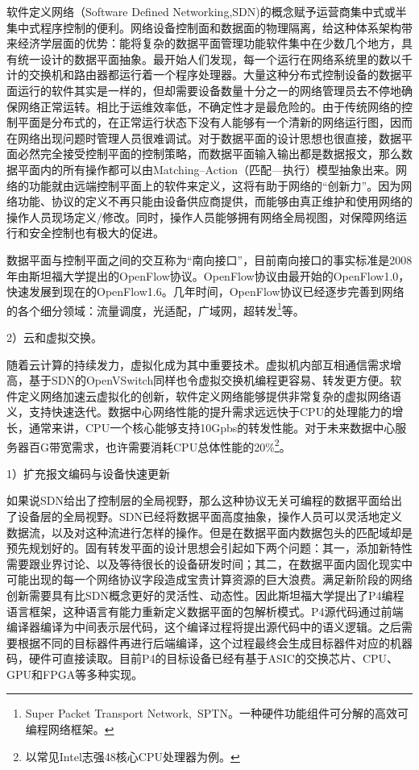 软件定义网络（Software Defined Networking,SDN)的概念赋予运营商集中式或半集中式程序控制的便利。网络设备控制面和数据面的物理隔离，给这种体系架构带来经济学层面的优势：能将复杂的数据平面管理功能软件集中在少数几个地方，具有统一设计的数据平面抽象。最开始人们发现，每一个运行在网络系统里的数以千计的交换机和路由器都运行着一个程序处理器。大量这种分布式控制设备的数据平面运行的软件其实是一样的，但却需要设备数量十分之一的网络管理员去不停地确保网络正常运转。相比于运维效率低，不确定性才是最危险的。由于传统网络的控制平面是分布式的，在正常运行状态下没有人能够有一个清新的网络运行图，因而在网络出现问题时管理人员很难调试。对于数据平面的设计思想也很直接，数据平面必然完全接受控制平面的控制策略，而数据平面输入输出都是数据报文，那么数据平面内的所有操作都可以由Matching--Action（匹配---执行）模型抽象出来。网络的功能就由远端控制平面上的软件来定义，这将有助于网络的“创新力”。因为网络功能、协议的定义不再只能由设备供应商提供，而能够由真正维护和使用网络的操作人员现场定义/修改。同时，操作人员能够拥有网络全局视图，对保障网络运行和安全控制也有极大的促进。

数据平面与控制平面之间的交互称为“南向接口”，目前南向接口的事实标准是2008年由斯坦福大学提出的OpenFlow协议。OpenFlow协议由最开始的OpenFlow1.0，快速发展到现在的OpenFlow1.6。几年时间，OpenFlow协议已经逐步完善到网络的各个细分领域：流量调度，光适配，广域网，超转发\footnote{Super Packet Transport Network,~SPTN。一种硬件功能组件可分解的高效可编程网络框架。}等。

2）云和虚拟交换。

随着云计算的持续发力，虚拟化成为其中重要技术。虚拟机内部互相通信需求增高，基于SDN的OpenVSwitch同样也令虚拟交换机编程更容易、转发更方便。软件定义网络加速云虚拟化的创新，软件定义网络能够提供非常复杂的虚拟网络语义，支持快速迭代。数据中心网络性能的提升需求远远快于CPU的处理能力的增长，通常来讲，CPU一个核心能够支持10Gpbs的转发性能。对于未来数据中心服务器百G带宽需求，也许需要消耗CPU总体性能的20\%\footnote{以常见Intel志强48核心CPU处理器为例。}。


\label{chap224}
1）扩充报文编码与设备快速更新

如果说SDN给出了控制层的全局视野，那么这种协议无关可编程的数据平面给出了设备层的全局视野。SDN已经将数据平面高度抽象，操作人员可以灵活地定义数据流，以及对这种流进行怎样的操作。但是在数据平面内数据包头的匹配域却是预先规划好的。固有转发平面的设计思想会引起如下两个问题：其一，添加新特性需要跟业界讨论、以及等待很长的设备研发时间；其二，在数据平面内固化现实中可能出现的每一个网络协议字段造成宝贵计算资源的巨大浪费。满足新阶段的网络创新需要具有比SDN概念更好的灵活性、动态性。因此斯坦福大学提出了P4编程语言框架，这种语言有能力重新定义数据平面的包解析模式。P4源代码通过前端编译器编译为中间表示层代码，这个编译过程将提出源代码中的语义逻辑。之后需要根据不同的目标器件再进行后端编译，这个过程最终会生成目标器件对应的机器码，硬件可直接读取。目前P4的目标设备已经有基于ASIC的交换芯片、CPU、GPU和FPGA等多种实现。

